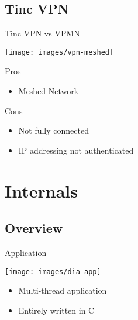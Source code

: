 \documentclass{beamer}
\newcommand*{\comparativeframe}[5]{
\begin{frame}{#1}
	#2
	\begin{exampleblock}{Pros}
		\begin{itemize}
		#3
		\end{itemize}
	\end{exampleblock}
	\begin{alertblock}{Cons}
		\begin{itemize}
		#4
		\end{itemize}
	\end{alertblock}
	#5
\end{frame}
}
\begin{document}
\subsection{Tinc VPN}
\comparativeframe{Tinc VPN vs VPMN}
{\begin{center}
\texttt{[image: images/vpn-meshed]}
\end{center}}
{%
\item Meshed Network
}{%
\item Not fully connected
\item IP addressing not authenticated
}{}

\section{Internals}
\subsection{Overview}
\begin{frame}{Application}
	\begin{center}
	\texttt{[image: images/dia-app]}
	\end{center}
	\begin{itemize}
	\item Multi-thread application 
	\item Entirely written in C
	\end{itemize}
\end{frame}
\end{document}
